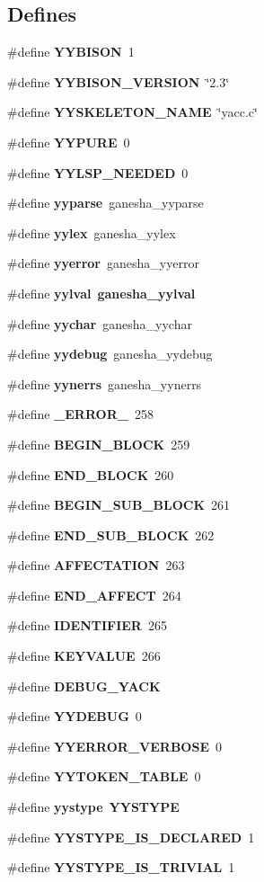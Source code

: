 \subsection*{Defines}
\begin{CompactItemize}
\item 
\#define {\bf YYBISON}~1
\item 
\#define {\bf YYBISON\_\-VERSION}~\char`\"{}2.3\char`\"{}
\item 
\#define {\bf YYSKELETON\_\-NAME}~\char`\"{}yacc.c\char`\"{}
\item 
\#define {\bf YYPURE}~0
\item 
\#define {\bf YYLSP\_\-NEEDED}~0
\item 
\#define {\bf yyparse}~ganesha\_\-yyparse
\item 
\#define {\bf yylex}~ganesha\_\-yylex
\item 
\#define {\bf yyerror}~ganesha\_\-yyerror
\item 
\#define {\bf yylval}~{\bf ganesha\_\-yylval}
\item 
\#define {\bf yychar}~ganesha\_\-yychar
\item 
\#define {\bf yydebug}~ganesha\_\-yydebug
\item 
\#define {\bf yynerrs}~ganesha\_\-yynerrs
\item 
\#define {\bf \_\-ERROR\_\-}~258
\item 
\#define {\bf BEGIN\_\-BLOCK}~259
\item 
\#define {\bf END\_\-BLOCK}~260
\item 
\#define {\bf BEGIN\_\-SUB\_\-BLOCK}~261
\item 
\#define {\bf END\_\-SUB\_\-BLOCK}~262
\item 
\#define {\bf AFFECTATION}~263
\item 
\#define {\bf END\_\-AFFECT}~264
\item 
\#define {\bf IDENTIFIER}~265
\item 
\#define {\bf KEYVALUE}~266
\item 
\#define {\bf DEBUG\_\-YACK}
\item 
\#define {\bf YYDEBUG}~0
\item 
\#define {\bf YYERROR\_\-VERBOSE}~0
\item 
\#define {\bf YYTOKEN\_\-TABLE}~0
\item 
\#define {\bf yystype}~{\bf YYSTYPE}
\item 
\#define {\bf YYSTYPE\_\-IS\_\-DECLARED}~1
\item 
\#define {\bf YYSTYPE\_\-IS\_\-TRIVIAL}~1

\end{CompactItemize}
